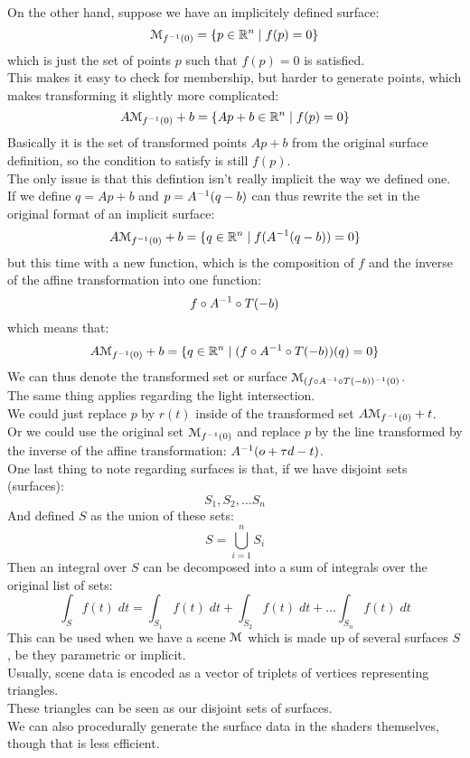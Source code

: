 \documentclass[12pt]{article}
\begin{document}
On the other hand, suppose we have an implicitely
defined surface:
\[ \mathcal{M}_{f^{-1}(0)}
= \{ p \in \mathbb{R}^n \mid f(p) =0 \} \]
which is just the set of points $p$
such that $f(p) = 0$ is satisfied. \\
This makes it easy to check for membership,
but harder to generate points,
which makes transforming it slightly more
complicated:
\[ A\mathcal{M}_{f^{-1}(0)} + b
= \{ Ap + b \in \mathbb{R}^n \mid f(p) =0 \} \]
Basically it is the set of transformed points 
$Ap + b$ from the original surface definition,
so the condition to satisfy is still $f(p)$. \\
The only issue is that this defintion isn't
really implicit the way we defined one. \\
If we define $q = Ap + b$
and $p = A^{-1}(q - b)$ can thus rewrite
the set in the original format of
an implicit surface:
\[ A\mathcal{M}_{f^{-1}(0)} + b
= \{ q \in \mathbb{R}^n \mid f(A^{-1}(q - b)) = 0 \} \]
but this time with a new function,
which is the composition of $f$ and the inverse of the
affine transformation into one function:
\[ f \circ A^{-1} \circ T(-b) \]
which means that:
\[ A\mathcal{M}_{f^{-1}(0)} + b
= \{ q \in \mathbb{R}^n \mid 
(f \circ A^{-1} \circ T(-b))(q) = 0 \} \]
We can thus denote the transformed set or surface
$\mathcal{M}_{(f \circ A^{-1} \circ T(-b))^{-1}(0)}$. \\

The same thing applies regarding the
light intersection. \\
We could just replace $p$
by $r(t)$
inside of the transformed set 
$A\mathcal{M}_{f^{-1}(0)} + t$. \\
Or we could use the original set
$\mathcal{M}_{f^{-1}(0)}$
and replace $p$
by the line transformed by the inverse of
the affine transformation: 
$A^{-1}(o + \tau d - t)$. \\

One last thing to note regarding surfaces
is that, if we have disjoint sets (surfaces):
\[ S_1, S_2, \dots S_n \]
And defined $S$ as the union of these sets:
\[ S = \bigcup_{i = 1}^n S_i \]
Then an integral over $S$
can be decomposed into a sum of integrals
over the original list of sets:
\[ \int_S f(t)\;dt
= \int_{S_1} f(t)\;dt + \int_{S_2} f(t)\;dt +
\dots \int_{S_n} f(t)\;dt \]
This can be used when we have a scene
$\mathcal{M}$ which is made up of several surfaces
$S$, be they parametric or implicit. \\

Usually, scene data is encoded as a vector
of triplets of vertices representing triangles. \\
These triangles can be seen as our disjoint
sets of surfaces. \\
We can also procedurally generate the surface
data in the shaders themselves, though that is
less efficient. \\
\end{document}
